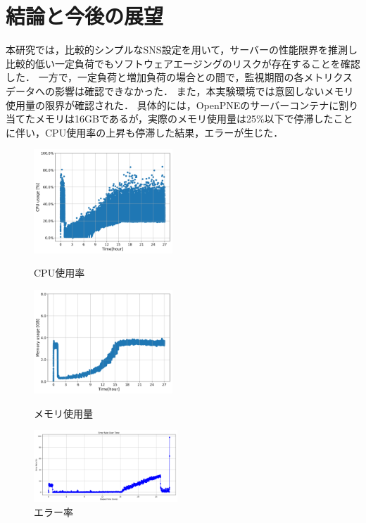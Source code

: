 \documentclass[twoside,twocolumn,10pt]{jarticle}  %
\begin{document}
\section{結論と今後の展望}
本研究では，比較的シンプルなSNS設定を用いて，サーバーの性能限界を推測し比較的低い一定負荷でもソフトウェアエージングのリスクが存在することを確認した．
一方で，一定負荷と増加負荷の場合との間で，監視期間の各メトリクスデータへの影響は確認できなかった．
また，本実験環境では意図しないメモリ使用量の限界が確認された．
具体的には，OpenPNEのサーバーコンテナに割り当てたメモリは16GBであるが，実際のメモリ使用量は25\%以下で停滞したことに伴い，CPU使用率の上昇も停滞した結果，エラーが生じた．
\begin{figure}[t]
  \centering
  \includegraphics[width=5.2cm]{figures/8core_1_15rps_increase_cpu.png}
  \vspace{-0.5cm}
  \caption{CPU使用率}
  \label{f1}

  \centering
  \includegraphics[width=5.2cm]{figures/8core_1_15rps_increase_mem.png}
  \vspace{-0.5cm}
  \caption{メモリ使用量}
  \label{f2}

  \centering
  \includegraphics[width=5.4cm]{figures/8core_1_15rps_error_rate.png}
  \vspace{-0.5cm}
  \caption{エラー率}
  \label{f3}
  \vspace{-0.3cm}
\end{figure}
\end{document}
